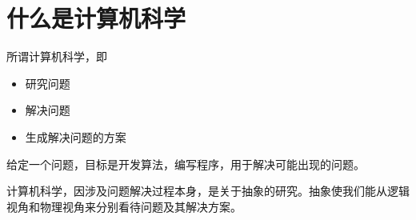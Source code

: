 \section{什么是计算机科学}

\begin{frame}\ft{\secname}
  所谓计算机科学，即
  \begin{itemize}
  \item 研究问题
  \item 解决问题
  \item 生成解决问题的方案
  \end{itemize}
  给定一个问题，目标是开发算法，编写程序，用于解决可能出现的问题。%
\end{frame}



\begin{frame}\ft{\secname}
计算机科学，因涉及问题解决过程本身，是关于抽象的研究。抽象使我们能从逻辑视角和物理视角来分别看待问题及其解决方案。%
\end{frame}

